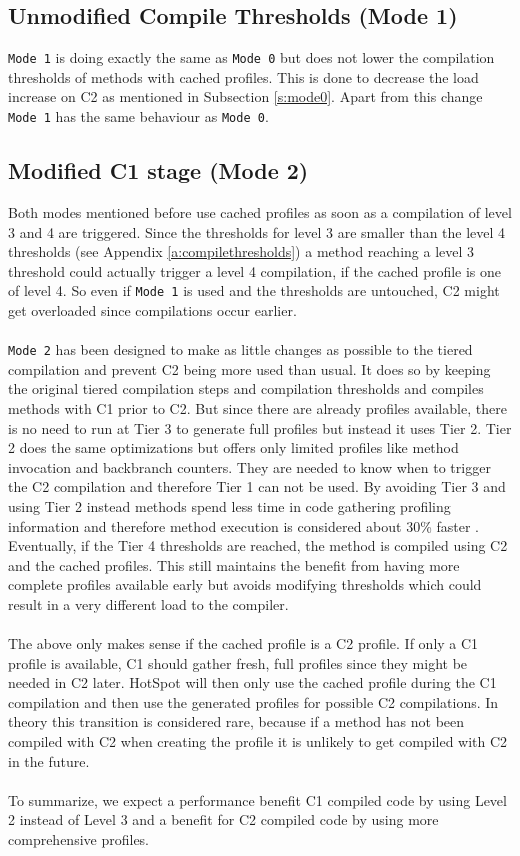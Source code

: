\subsection{Unmodified Compile Thresholds (Mode 1)}
\label{s:mode1}
\texttt{Mode 1} is doing exactly the same as \texttt{Mode 0} but does not lower the compilation thresholds of methods with cached profiles.
This is done to decrease the load increase on C2 as mentioned in Subsection \ref{s:mode0}.
Apart from this change \texttt{Mode 1} has the same behaviour as \texttt{Mode 0}.
\subsection{Modified C1 stage (Mode 2)}
\label{s:mode2}
Both modes mentioned before use cached profiles as soon as a compilation of level 3 and 4 are triggered. Since the thresholds for level 3 are smaller than the level 4 thresholds (see Appendix \ref{a:compilethresholds}) a method reaching a level 3 threshold could actually trigger a level 4 compilation, if the cached profile is one of level 4. So even if \texttt{Mode 1} is used and the thresholds are untouched, C2 might get overloaded since compilations occur earlier.
\\\\
\texttt{Mode 2} has been designed to make as little changes as possible to the tiered compilation and prevent C2 being more used than usual. It does so by keeping the original tiered compilation steps and compilation thresholds and compiles methods with C1 prior to C2. But since there are already profiles available, there is no need to run at Tier 3 to generate full profiles but instead it uses Tier 2.
Tier 2 does the same optimizations but offers only limited profiles like method invocation and backbranch counters. They are needed to know when to trigger the C2 compilation and therefore Tier 1 can not be used. 
By avoiding Tier 3 and using Tier 2 instead methods spend less time in code gathering profiling information and therefore method execution is considered about 30\% faster \cite{code_atp_hpp}.
Eventually, if the Tier 4 thresholds are reached, the method is compiled using C2 and the cached profiles. This still maintains the benefit from having more complete profiles available early but avoids modifying thresholds which could result in a very different load to the compiler. 
\\\\
The above only makes sense if the cached profile is a C2 profile.
If only a C1 profile is available, C1 should gather fresh, full profiles since they might be needed in C2 later. HotSpot will then only use the cached profile during the C1 compilation and then use the generated profiles for possible C2 compilations.
In theory this transition is considered rare, because if a method has not been compiled with C2 when creating the profile it is unlikely to get compiled with C2 in the future.
\\\\
To summarize, we expect a performance benefit C1 compiled code by using Level 2 instead of Level 3 and a benefit for C2 compiled code by using more comprehensive profiles.

